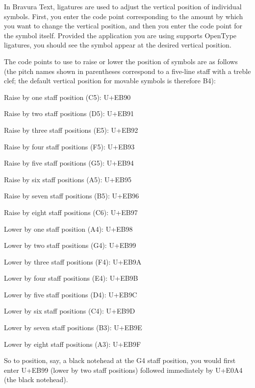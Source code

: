 In Bravura Text, ligatures are used to adjust the vertical position of individual symbols. First, you enter the code point corresponding to the amount by which you want to change the vertical position, and then you enter the code point for the symbol itself. Provided the application you are using supports Open\+Type ligatures, you should see the symbol appear at the desired vertical position.

The code points to use to raise or lower the position of symbols are as follows (the pitch names shown in parentheses correspond to a five-\/line staff with a treble clef; the default vertical position for movable symbols is therefore B4)\+:


\begin{DoxyItemize}
\item Raise by one staff position (C5)\+: U+\+E\+B90
\item Raise by two staff positions (D5)\+: U+\+E\+B91
\item Raise by three staff positions (E5)\+: U+\+E\+B92
\item Raise by four staff positions (F5)\+: U+\+E\+B93
\item Raise by five staff positions (G5)\+: U+\+E\+B94
\item Raise by six staff positions (A5)\+: U+\+E\+B95
\item Raise by seven staff positions (B5)\+: U+\+E\+B96
\item Raise by eight staff positions (C6)\+: U+\+E\+B97
\item Lower by one staff position (A4)\+: U+\+E\+B98
\item Lower by two staff positions (G4)\+: U+\+E\+B99
\item Lower by three staff positions (F4)\+: U+\+E\+B9A
\item Lower by four staff positions (E4)\+: U+\+E\+B9B
\item Lower by five staff positions (D4)\+: U+\+E\+B9C
\item Lower by six staff positions (C4)\+: U+\+E\+B9D
\item Lower by seven staff positions (B3)\+: U+\+E\+B9E
\item Lower by eight staff positions (A3)\+: U+\+E\+B9F
\end{DoxyItemize}

So to position, say, a black notehead at the G4 staff position, you would first enter U+\+E\+B99 (lower by two staff positions) followed immediately by U+\+E0\+A4 (the black notehead).

